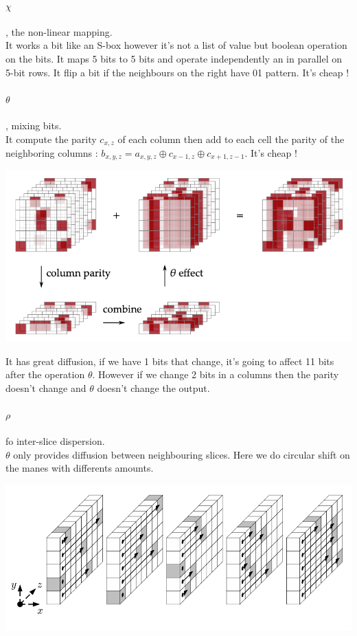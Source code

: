 \documentclass[11pt,a4paper]{report}
\begin{document}
\paragraph{$\chi$}, the non-linear mapping. \\
It works a bit like an S-box however it's not a list of value but boolean operation on the bits. It maps 5 bits to 5 bits and operate independently an in parallel on 5-bit rows. It flip a bit if the neighbours on the right have 01 pattern. It's cheap !

\paragraph{$\theta$}, mixing bits.\\
It compute the parity $c_{x,z}$ of each column then add to each cell the parity of the neighboring columns : $b_{x,y,z} = a_{x,y,z} \oplus c_{x-1,z} \oplus c_{x+1,z-1}$. It's cheap !
\begin{center}
\includegraphics[scale=0.5]{img/img29.png}
\end{center}
It has great diffusion, if we have 1 bits that change, it's going to affect 11 bits after the operation $\theta$. However if we change 2 bits in a columns then the parity doesn't change and $\theta$ doesn't change the output.

\paragraph{$\rho$} fo inter-slice dispersion.\\
$\theta$ only provides diffusion between neighbouring slices. Here we do circular shift on the manes with differents amounts.
\begin{center}
\includegraphics[scale=0.5]{img/img30.png}
\end{center}
\end{document}
